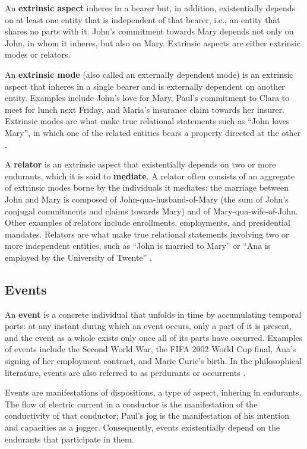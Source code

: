 An \textbf{extrinsic aspect} inheres in a bearer but, in addition, existentially depends on at least one entity that is independent of that bearer, i.e., an entity that shares no parts with it. John's commitment towards Mary depends not only on John, in whom it inheres, but also on Mary. Extrinsic aspects are either extrinsic modes or relators.

An \textbf{extrinsic mode} (also called an externally dependent mode) is an extrinsic aspect that inheres in a single bearer and is externally dependent on another entity. Examples include John's love for Mary, Paul's commitment to Clara to meet for lunch next Friday, and Maria's insurance claim towards her insurer. Extrinsic modes are what make true relational statements such as ``John loves Mary'', in which one of the related entities bears a property directed at the other \cite{guarino2015we}.

A \textbf{relator} is an extrinsic aspect that existentially depends on two or more endurants, which it is said to \textbf{mediate}. A relator often consists of an aggregate of extrinsic modes borne by the individuals it mediates: the marriage between John and Mary is composed of John-qua-husband-of-Mary (the sum of John's conjugal commitments and claims towards Mary) and of Mary-qua-wife-of-John. Other examples of relators include enrollments, employments, and presidential mandates. Relators are what make true relational statements involving two or more independent entities, such as ``John is married to Mary'' or ``Ana is employed by the University of Twente'' \cite{relations_in_ontology_driven_conceptual_modeling_2019}.

\subsection{Events}

An \textbf{event} is a concrete individual that unfolds in time by accumulating temporal parts: at any instant during which an event occurs, only a part of it is present, and the event as a whole exists only once all of its parts have occurred. Examples of events include the Second World War, the FIFA 2002 World Cup final, Ana's signing of her employment contract, and Marie Curie's birth. In the philosophical literature, events are also referred to as perdurants or occurrents \cite{towards_ontological_foundations_for_the_conceptual_modeling_of_events_2013,events_as_entities_in_ontology_driven_conceptual_modeling_2019}.

Events are manifestations of dispositions, a type of aspect, inhering in endurants. The flow of electric current in a conductor is the manifestation of the conductivity of that conductor; Paul's jog is the manifestation of his intention and capacities as a jogger. Consequently, events existentially depend on the endurants that participate in them.

